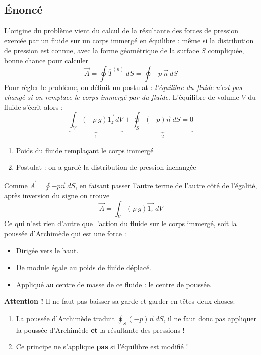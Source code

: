     \subsection{Énoncé}
	L'origine du problème vient du calcul de la résultante des forces de pression exercée par
	un fluide sur un corps immergé en équilibre ; même si la distribution de pression est 
	connue, avec la forme géométrique de la surface $S$ compliquée, bonne chance pour 
	calculer 
	\begin{equation}
	\vec{A} = \oint \overline{T}^{(n)}\ dS = \oint -p\ \vec{n}\ dS
	\end{equation}
	Pour régler le problème, on définit un postulat : \textit{l'équilibre du fluide n'est 
	pas changé si on remplace le corps immergé par du fluide}. L'équilibre de volume $V$ 
	du fluide s'écrit alors :
	\begin{equation}
	\underbrace{\int_V (-\rho\ g)\vec{1_z}\ dV}_{1} + \underbrace{\oint_S (-p)\vec{n}\ dS
	 =0}_{2}
	\end{equation}
	\begin{enumerate}
	\item Poids du fluide remplaçant le corps immergé
	\item Postulat : on a gardé la distribution de pression inchangée
	\end{enumerate}
	Comme $\vec A = \oint - p\vec{n}\ dS$, en faisant passer l'autre terme de l'autre côté
	de l'égalité, après inversion du signe on trouve 
	\begin{equation}
	\vec{A} = \int_V (\rho\ g)\vec{1_z}\ dV
	\end{equation}
	Ce qui n'est rien d'autre que l'action du fluide sur le corps immergé, soit la poussée
	d'Archimède qui est une force :
	\begin{itemize}
	\item Dirigée vers le  haut.
	\item De module égale au poids de fluide déplacé.
	\item Appliqué au centre de masse de ce fluide : le centre de poussée.
	\end{itemize}
	
	\textbf{Attention !} Il ne faut pas baisser sa garde et garder en têtes deux choses:
	\begin{enumerate}
	\item La poussée d'Archimède traduit $\oint_S (-p)\vec{n}\ dS$, il ne faut donc pas 
	appliquer la poussée d'Archimède \textbf{et} la résultante des pressions !
	\item Ce principe ne s'applique \textbf{pas} si l'équilibre est modifié !
	\end{enumerate}    
    
